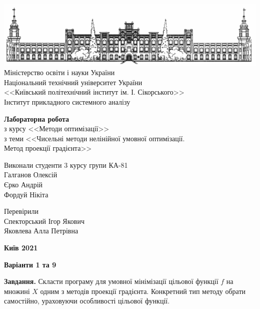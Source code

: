 \documentclass{extreport}
\begin{document}
\begin{titlepage}
    \thispagestyle{empty}
    \begin{center}
        \includegraphics[width = \textwidth]{kpi}
        Міністерство освіти і науки України\\
        Національний технічний університет України\\
        <<Київський політехнічний інститут ім. І. Сікорського>>\\
        Інститут прикладного системного аналізу
    \end{center}
    \vspace{40mm}
    \begin{center}
        \textbf{Лабораторна робота} \\
        з курсу <<Методи оптимізації>> \\
        з теми <<Чисельні методи нелінійної умовної оптимізації. \\
        Метод проекції градієнта>>
    \end{center}
    \vspace{20mm}
    \begin{flushleft}
        Виконали студенти 3 курсу групи КА-81 \\
        Галганов Олексій \\
        Єрко Андрій \\
        Фордуй Нікіта
    \end{flushleft}
    \begin{flushright}
        Перевірили \\
        Спекторський Ігор Якович \\
        Яковлева Алла Петрівна
    \end{flushright}
    \vspace{30mm}
    \begin{center}
        \textbf{Київ 2021}
    \end{center}
\end{titlepage}

\begin{center}
    \textbf{Варіанти 1 та 9}
\end{center}
\textbf{Завдання.} Скласти програму для умовної мінімізації цільової функції $f$ на множині $X$
одним з методів проекції градієнта. Конкретний тип методу обрати
самостійно, ураховуючи особливості цільової функції.
\end{document}
